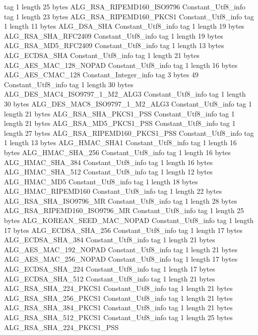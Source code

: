 {{{			tag	1
			length	25
			bytes	ALG_RSA_RIPEMD160_ISO9796
		}
		Constant_Utf8_info {
			tag	1
			length	23
			bytes	ALG_RSA_RIPEMD160_PKCS1
		}
		Constant_Utf8_info {
			tag	1
			length	11
			bytes	ALG_DSA_SHA
		}
		Constant_Utf8_info {
			tag	1
			length	19
			bytes	ALG_RSA_SHA_RFC2409
		}
		Constant_Utf8_info {
			tag	1
			length	19
			bytes	ALG_RSA_MD5_RFC2409
		}
		Constant_Utf8_info {
			tag	1
			length	13
			bytes	ALG_ECDSA_SHA
		}
		Constant_Utf8_info {
			tag	1
			length	21
			bytes	ALG_AES_MAC_128_NOPAD
		}
		Constant_Utf8_info {
			tag	1
			length	16
			bytes	ALG_AES_CMAC_128
		}
		Constant_Integer_info {
			tag	3
			bytes	49
		}
		Constant_Utf8_info {
			tag	1
			length	30
			bytes	ALG_DES_MAC4_ISO9797_1_M2_ALG3
		}
		Constant_Utf8_info {
			tag	1
			length	30
			bytes	ALG_DES_MAC8_ISO9797_1_M2_ALG3
		}
		Constant_Utf8_info {
			tag	1
			length	21
			bytes	ALG_RSA_SHA_PKCS1_PSS
		}
		Constant_Utf8_info {
			tag	1
			length	21
			bytes	ALG_RSA_MD5_PKCS1_PSS
		}
		Constant_Utf8_info {
			tag	1
			length	27
			bytes	ALG_RSA_RIPEMD160_PKCS1_PSS
		}
		Constant_Utf8_info {
			tag	1
			length	13
			bytes	ALG_HMAC_SHA1
		}
		Constant_Utf8_info {
			tag	1
			length	16
			bytes	ALG_HMAC_SHA_256
		}
		Constant_Utf8_info {
			tag	1
			length	16
			bytes	ALG_HMAC_SHA_384
		}
		Constant_Utf8_info {
			tag	1
			length	16
			bytes	ALG_HMAC_SHA_512
		}
		Constant_Utf8_info {
			tag	1
			length	12
			bytes	ALG_HMAC_MD5
		}
		Constant_Utf8_info {
			tag	1
			length	18
			bytes	ALG_HMAC_RIPEMD160
		}
		Constant_Utf8_info {
			tag	1
			length	22
			bytes	ALG_RSA_SHA_ISO9796_MR
		}
		Constant_Utf8_info {
			tag	1
			length	28
			bytes	ALG_RSA_RIPEMD160_ISO9796_MR
		}
		Constant_Utf8_info {
			tag	1
			length	25
			bytes	ALG_KOREAN_SEED_MAC_NOPAD
		}
		Constant_Utf8_info {
			tag	1
			length	17
			bytes	ALG_ECDSA_SHA_256
		}
		Constant_Utf8_info {
			tag	1
			length	17
			bytes	ALG_ECDSA_SHA_384
		}
		Constant_Utf8_info {
			tag	1
			length	21
			bytes	ALG_AES_MAC_192_NOPAD
		}
		Constant_Utf8_info {
			tag	1
			length	21
			bytes	ALG_AES_MAC_256_NOPAD
		}
		Constant_Utf8_info {
			tag	1
			length	17
			bytes	ALG_ECDSA_SHA_224
		}
		Constant_Utf8_info {
			tag	1
			length	17
			bytes	ALG_ECDSA_SHA_512
		}
		Constant_Utf8_info {
			tag	1
			length	21
			bytes	ALG_RSA_SHA_224_PKCS1
		}
		Constant_Utf8_info {
			tag	1
			length	21
			bytes	ALG_RSA_SHA_256_PKCS1
		}
		Constant_Utf8_info {
			tag	1
			length	21
			bytes	ALG_RSA_SHA_384_PKCS1
		}
		Constant_Utf8_info {
			tag	1
			length	21
			bytes	ALG_RSA_SHA_512_PKCS1
		}
		Constant_Utf8_info {
			tag	1
			length	25
			bytes	ALG_RSA_SHA_224_PKCS1_PSS
}}}
